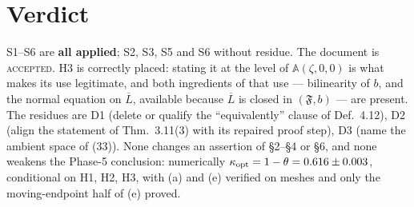 \documentclass[11pt]{article}
\newcommand{\Aop}{\mathbb A}
\begin{document}
\section{Verdict}\label{sec:verdict}
S1--S6 are \textbf{all applied}; S2, S3, S5 and S6 without residue.  The document is
\textsc{accepted}.  H3 is correctly placed: stating it at the level of $\Aop(\zeta,0,0)$ is
what makes its use legitimate, and both ingredients of that use --- bilinearity of $b$, and
the normal equation on $\overline L$, available because $\overline L$ is closed in
$(\mathfrak F,b)$ --- are present.  The residues are D1 (delete or qualify the
``equivalently'' clause of Def.~4.12), D2 (align the statement of Thm.~3.11(3) with its
repaired proof step), D3 (name the ambient space of (33)).  None changes an assertion of
\S2--\S4 or \S6, and none weakens the Phase-5 conclusion: numerically
$\kappa_{\rm opt}=1-\theta=0.616\pm0.003$, conditional on H1, H2, H3, with (a) and (e)
verified on meshes and only the moving-endpoint half of (e) proved.
\end{document}
